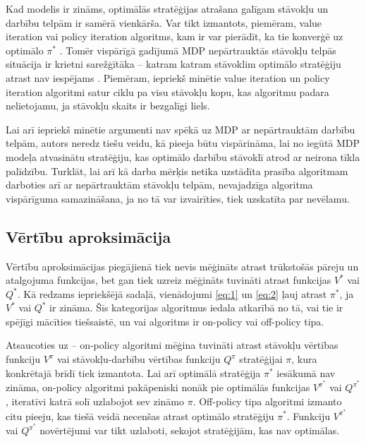 \documentclass{ludis} %
\begin{document}
Kad modelis ir zināms, optimālās stratēģijas atrašana galīgam stāvokļu un darbību telpām ir samērā vienkārša. Var tikt izmantots, piemēram, value iteration vai policy iteration algoritms, kam ir var pierādīt, ka tie konverģē uz optimālo $\pi^*$ \autocite{Barto}.
Tomēr vispārīgā gadījumā MDP nepārtrauktās stāvokļu telpās situācija ir krietni sarežģītāka -- katram katram stāvoklim optimālo stratēģiju atrast nav iespējams \autocite{Otterlo}.
Piemēram, iepriekš minētie value iteration un policy iteration algoritmi satur ciklu pa visu stāvokļu kopu, kas algoritmu padara nelietojamu, ja stāvokļu skaits ir bezgalīgi liels.


Lai arī iepriekš minētie argumenti nav spēkā uz MDP ar nepārtrauktām darbību telpām, autors neredz tiešu veidu, kā pieeja būtu vispārināma, lai no iegūtā MDP modeļa atvasinātu stratēģiju, kas optimālo darbību stāvoklī atrod ar neirona tīkla palīdzību.
Turklāt, lai arī kā darba mērķis netika uzstādīta prasība algoritmam darboties arī ar nepārtrauktām stāvokļu telpām, nevajadzīga algoritma vispārīguma samazināšana, ja no tā var izvairīties, tiek uzskatīta par nevēlamu.

\subsection{Vērtību aproksimācija}
Vērtību aproksimācijas piegājienā tiek nevis mēģināts atrast trūkstošās pāreju un atalgojuma funkcijas, bet gan tiek uzreiz mēģināts tuvināti atrast funkcijas $V^*$ vai $Q^*$.
Kā redzams iepriekšējā sadaļā, vienādojumi \eqref{eq:1} un \eqref{eq:2} ļauj atrast $\pi^*$, ja $V^*$ vai $Q^*$ ir zināma.
Šīs kategorijas algoritmus iedala atkarībā no tā, vai tie ir spējīgi mācīties tiešsaistē, un vai algoritms ir on-policy vai off-policy tipa.

Atsaucoties uz \autocite{Hasselt2012} -- on-policy algoritmi mēģina tuvināti atrast stāvokļu vērtības funkciju $V^\pi$ vai stāvokļu-darbību vērtības funkciju $Q^\pi$ stratēģijai $\pi$, kura konkrētajā brīdī tiek izmantota.
Lai arī optimālā stratēģija $\pi^*$ iesākumā nav zināma, on-policy algoritmi pakāpeniski nonāk pie optimālās funkcijas $V^{\pi^*}$ vai $Q^{\pi^*}$, iteratīvi katrā solī uzlabojot sev zināmo $\pi$.
Off-policy tipa algoritmi izmanto citu pieeju, kas tiešā veidā necenšas atrast optimālo stratēģiju $\pi^*$.
Funkciju $V^{\pi^*}$ vai $Q^{\pi^*}$ novērtējumi var tikt uzlaboti, sekojot stratēģijām, kas nav optimālas.
\end{document}

